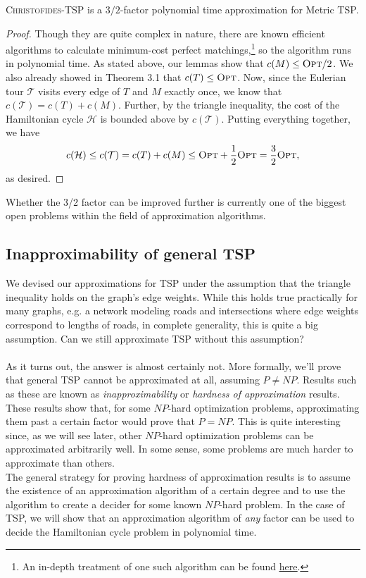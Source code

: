 \documentclass{article}
\newenvironment{theorem}[2][Theorem]{\begin{trivlist}
\item[\hskip \labelsep {\bfseries #1}\hskip \labelsep {\bfseries #2.}]}{\end{trivlist}}
\begin{document}
\begin{theorem}{3.4}{}
    \textsc{Christofides-TSP} is a $3/2$-factor polynomial time approximation for Metric TSP.

    \begin{proof}
        Though they are quite complex in nature, there are known efficient algorithms to calculate minimum-cost perfect matchings,\footnote{An in-depth treatment of one such algorithm can be found \href{https://courses.grainger.illinois.edu/cs598csc/sp2010/Lectures/Lecture11.pdf}{\underline{here}}.} so the algorithm runs in polynomial time. As stated above, our lemmas show that $c(M) \leq \textsc{Opt}/2$. We also already showed in Theorem 3.1 that $c(T) \leq \textsc{Opt}$. Now, since the Eulerian tour $\mathcal{T}$ visits every edge of $T$ and $M$ exactly once, we know that $c(\mathcal{T}) = c(T) + c(M)$. Further, by the triangle inequality, the cost of the Hamiltonian cycle $\mathcal{H}$ is bounded above by $c(\mathcal{T})$. Putting everything together, we have
        \[
        c(\mathcal{H}) \leq c(\mathcal{T}) = c(T) + c(M) \leq \textsc{Opt} + \frac{1}{2} \textsc{Opt} = \frac{3}{2} \textsc{Opt},
        \]
        as desired.
    \end{proof}
\end{theorem}


\noindent Whether the 3/2 factor can be improved further is currently one of the biggest open problems within the field of approximation algorithms.

\subsection{Inapproximability of general TSP}

We devised our approximations for TSP under the assumption that the triangle inequality holds on the graph's edge weights. While this holds true practically for many graphs, e.g. a network modeling roads and intersections where edge weights correspond to lengths of roads, in complete generality, this is quite a big assumption. Can we still approximate TSP without this assumption?\\
\\
As it turns out, the answer is almost certainly not. More formally, we'll prove that general TSP cannot be approximated at all, assuming $P \neq NP$. Results such as these are known as \textit{inapproximability} or \textit{hardness of approximation} results. These results show that, for some $NP$-hard optimization problems, approximating them past a certain factor would prove that $P = NP$. This is quite interesting since, as we will see later, other $NP$-hard optimization problems can be approximated arbitrarily well. In some sense, some problems are much harder to approximate than others.\\
The general strategy for proving hardness of approximation results is to assume the existence of an approximation algorithm of a certain degree and to use the algorithm to create a decider for some known $NP$-hard problem. In the case of TSP, we will show that an approximation algorithm of \textit{any} factor can be used to decide the Hamiltonian cycle problem in polynomial time.
\end{document}

